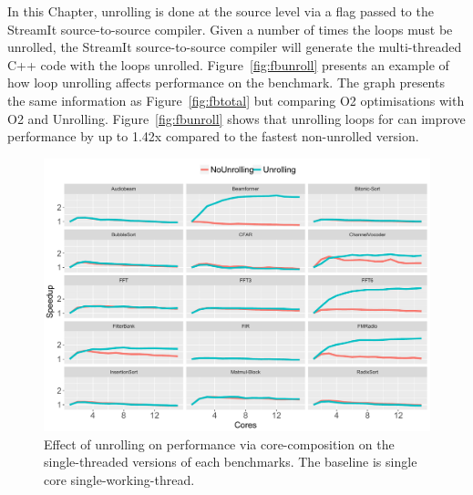 In this Chapter, unrolling is done at the source level via a flag passed to the StreamIt source-to-source compiler.
Given a number of times the loops must be unrolled, the StreamIt source-to-source compiler will generate the multi-threaded C++ code with the loops unrolled.
Figure~\ref{fig:fbunroll} presents an example of how loop unrolling affects performance on the  benchmark.
The graph presents the same information as Figure~\ref{fig:fbtotal} but comparing O2 optimisations with O2 and Unrolling.
Figure~\ref{fig:fbunroll} shows that unrolling loops for  can improve performance by up to 1.42x compared to the fastest non-unrolled version.

\begin{figure}[t]
  \includegraphics[width=1\textwidth]{streamit-paper/graphics/unroll_speed_bars2.pdf}
  \vspace{-1em}
  \caption{Effect of unrolling on performance via core-composition on the single-threaded versions of each benchmarks. The baseline is single core single-working-thread.}\label{fig:unroll_summary}
  \vspace{-1em}
\end{figure}

